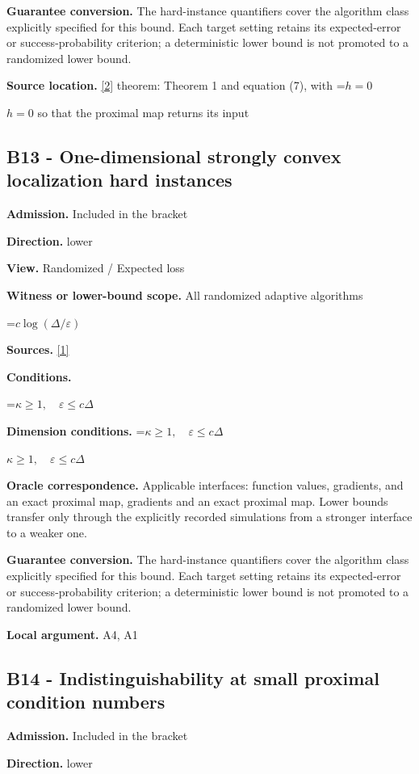 \documentclass[10pt,a4paper]{article}
\newcommand{\AtlasMath}[1]{\par\begingroup\centering\setbox0=\hbox{$\displaystyle #1$}\ifdim\wd0>1.4\linewidth\typeout{ATLAS WIDE FORMULA: \the\wd0}\fi\ifdim\wd0>\linewidth\resizebox{\linewidth}{!}{\box0}\else\box0\fi\par\endgroup}
\newcommand{\AtlasInlineMath}[1]{\begingroup\setbox0=\hbox{$#1$}\ifdim\wd0>.4\linewidth\endgroup\AtlasMath{#1}\else\endgroup$#1$\fi}
\begin{document}
\textbf{Guarantee conversion.} The hard-instance quantifiers cover the algorithm class explicitly specified for this bound. Each target setting retains its expected-error or success-probability criterion; a deterministic lower bound is not promoted to a randomized lower bound.

\textbf{Source location.} \href{https://arxiv.org/pdf/2609.10874}{[2]} theorem: Theorem 1 and equation (7), with \AtlasInlineMath{h=0} so that the proximal map returns its input

\subsection{B13 - One-dimensional strongly convex localization hard instances}
\textbf{Admission.} Included in the bracket

\textbf{Direction.} lower

\textbf{View.} Randomized / Expected loss

\textbf{Witness or lower-bound scope.} All randomized adaptive algorithms

\AtlasMath{c\log(\Delta/\varepsilon)}
\textbf{Sources.} \href{https://www.tau.ac.il/~becka/FISTA.pdf}{[1]}

\textbf{Conditions.} 
\AtlasMath{\kappa\ge1,\quad\varepsilon\le c\Delta}


\textbf{Dimension conditions.} \AtlasInlineMath{\kappa\ge1,\quad\varepsilon\le c\Delta}

\textbf{Oracle correspondence.} Applicable interfaces: function values, gradients, and an exact proximal map, gradients and an exact proximal map. Lower bounds transfer only through the explicitly recorded simulations from a stronger interface to a weaker one.

\textbf{Guarantee conversion.} The hard-instance quantifiers cover the algorithm class explicitly specified for this bound. Each target setting retains its expected-error or success-probability criterion; a deterministic lower bound is not promoted to a randomized lower bound.

\textbf{Local argument.} A4, A1

\subsection{B14 - Indistinguishability at small proximal condition numbers}
\textbf{Admission.} Included in the bracket

\textbf{Direction.} lower
\end{document}

